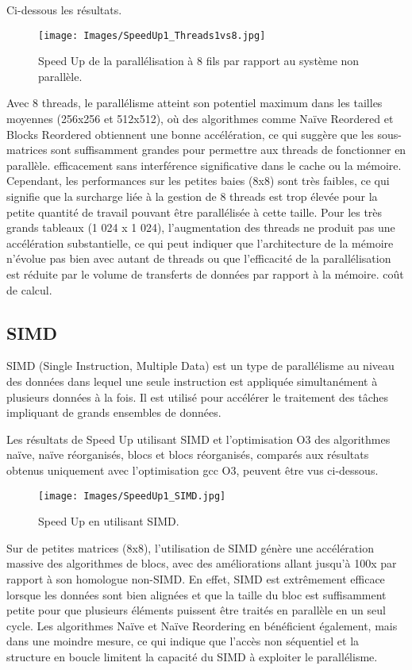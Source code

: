 \documentclass[../CSC_5RO06_TA.tex]{subfiles}
\begin{document}
Ci-dessous les résultats.

\begin{figure}[H]
    \centering
    \texttt{[image: Images/SpeedUp1\_Threads1vs8.jpg]}
    \caption{Speed Up de la parallélisation à 8 fils par rapport au système non parallèle.}
    \label{fig:8}
\end{figure}

Avec 8 threads, le parallélisme atteint son potentiel maximum dans les tailles moyennes (256x256 et 512x512), où des algorithmes comme Naïve Reordered et Blocks Reordered obtiennent une bonne accélération, ce qui suggère que les sous-matrices sont suffisamment grandes pour permettre aux threads de fonctionner en parallèle. efficacement sans interférence significative dans le cache ou la mémoire. Cependant, les performances sur les petites baies (8x8) sont très faibles, ce qui signifie que la surcharge liée à la gestion de 8 threads est trop élevée pour la petite quantité de travail pouvant être parallélisée à cette taille. Pour les très grands tableaux (1 024 x 1 024), l'augmentation des threads ne produit pas une accélération substantielle, ce qui peut indiquer que l'architecture de la mémoire n'évolue pas bien avec autant de threads ou que l'efficacité de la parallélisation est réduite par le volume de transferts de données par rapport à la mémoire. coût de calcul.

\subsection{SIMD}

SIMD (Single Instruction, Multiple Data) est un type de parallélisme au niveau des données dans lequel une seule instruction est appliquée simultanément à plusieurs données à la fois. Il est utilisé pour accélérer le traitement des tâches impliquant de grands ensembles de données.

Les résultats de Speed Up utilisant SIMD et l'optimisation O3 des algorithmes naïve, naïve réorganisés, blocs et blocs réorganisés, comparés aux résultats obtenus uniquement avec l'optimisation gcc O3, peuvent être vus ci-dessous.


\begin{figure}[H]
    \centering
    \texttt{[image: Images/SpeedUp1\_SIMD.jpg]}
    \caption{Speed Up en utilisant SIMD.}
    \label{fig:9}
\end{figure}

Sur de petites matrices (8x8), l'utilisation de SIMD génère une accélération massive des algorithmes de blocs, avec des améliorations allant jusqu'à 100x par rapport à son homologue non-SIMD. En effet, SIMD est extrêmement efficace lorsque les données sont bien alignées et que la taille du bloc est suffisamment petite pour que plusieurs éléments puissent être traités en parallèle en un seul cycle. Les algorithmes Naïve et Naïve Reordering en bénéficient également, mais dans une moindre mesure, ce qui indique que l'accès non séquentiel et la structure en boucle limitent la capacité du SIMD à exploiter le parallélisme.
\end{document}
